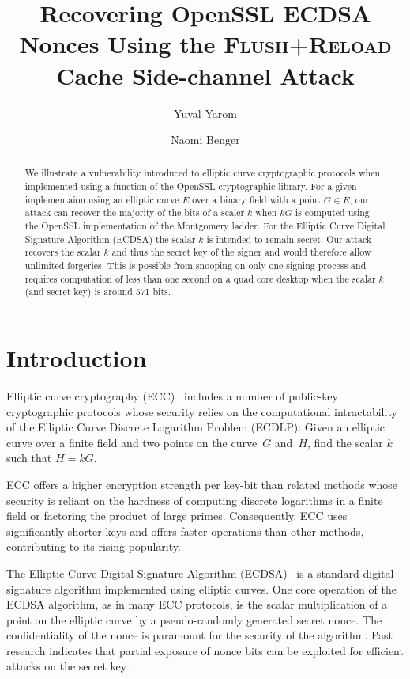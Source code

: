 \documentclass[twocolumn]{svjour3}
\begin{document}
\title{Recovering OpenSSL ECDSA Nonces Using the \textsc{Flush+Reload} Cache Side-channel Attack}
\author{Yuval Yarom \and Naomi Benger}

\maketitle

\begin{abstract}
We illustrate a vulnerability introduced to elliptic curve cryptographic protocols when implemented using a function of the OpenSSL cryptographic library.
For a given implementaion using an elliptic curve $E$ over a binary field with a point $G\in E$, our attack can recover the majority of the bits of a scaler $k$ when $kG$ is computed using the OpenSSL implementation of the Montgomery ladder. 
For the Elliptic Curve Digital Signature Algorithm (ECDSA) the scalar $k$ is intended to remain secret. 
Our attack recovers the scalar $k$ and thus the secret key of the signer and would therefore allow unlimited forgeries. 
This is possible from snooping on only one signing process and requires computation of less than one second on a quad core desktop when the scalar $k$ (and secret key) is around 571 bits.

\end{abstract}

\section{Introduction}
Elliptic curve cryptography (ECC)~\cite{miller85use,koblitz87elliptic} includes a number of public-key cryptographic protocols whose security relies on the computational intractability of the Elliptic Curve Discrete Logarithm Problem (ECDLP): Given an elliptic curve over a finite field and two points on the curve~$G$ and~$H$, find the scalar $k$ such that $H=kG$.

ECC offers a higher encryption strength per key-bit than related methods whose security is reliant on the hardness of computing discrete logarithms in a finite field or factoring the product of large primes. Consequently, ECC uses significantly shorter keys and offers faster operations than other methods, contributing to its rising popularity.

The Elliptic Curve Digital Signature Algorithm (ECDSA)~\cite{johnson01elliptic,fips,ansi962} is a standard
digital signature algorithm implemented using elliptic curves. One core operation of the ECDSA algorithm, as in many ECC protocols, is the scalar multiplication of a point on the elliptic curve by a pseudo-randomly generated secret nonce. The confidentiality of the nonce is paramount for the security of the algorithm. Past research indicates that partial exposure of nonce bits can be exploited for efficient attacks on the secret key~\cite{nguyen03insecurity,brumley11remote}.
\end{document}
